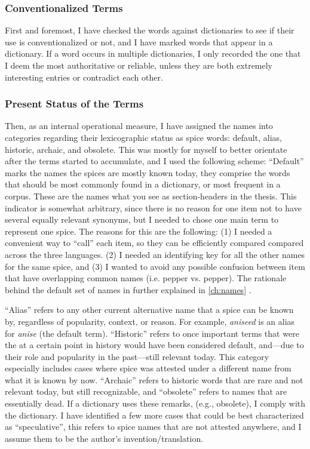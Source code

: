 \subsubsection{Conventionalized Terms}

First and foremost, I have checked the words against dictionaries to see if their use is conventionalized or not, and I have marked words that appear in a dictionary. If a word occurs in multiple dictionaries, I only recorded the one that I deem the most authoritative or reliable, unless they are both extremely interesting entries or contradict each other.

\subsubsection{Present Status of the Terms}

Then, as an internal operational measure, I have assigned the names into categories regarding their lexicographic status as spice words: default, alias, historic, archaic, and obsolete. This was mostly for myself to better orientate after the terms started to accumulate, and I used the following scheme: ``Default'' marks the names the spices are mostly known today, they comprise the words that should be most commonly found in a dictionary, or most frequent in a corpus. These are the names what you see as section-headers in the thesis. This indicator is somewhat arbitrary, since there is no reason for one item not to have several equally relevant synonyms, but I needed to chose one main term to represent one spice. The reasons for this are the following: (1) I needed a convenient way to ``call'' each item, so they can be efficiently compared compared across the three languages. (2) I needed an identifying key for all the other names for the same spice, and (3) I wanted to avoid any possible confusion between item that have overlapping common names (i.e. pepper vs. pepper). The rationale behind the default set of names in further explained in \cref{ch:names} .

``Alias'' refers to any other current alternative name that a spice can be known by, regardless of popularity, context, or reason. For example, \textit{aniseed} is an alias for \textit{anise} (the default term). ``Historic'' refers to once important terms that were the at a certain point in history would have been considered default, and---due to their role and popularity in the past---still relevant today. This category especially includes cases where spice was attested under a different name from what it is known by now. ``Archaic'' refers to historic words that are rare and not relevant today, but still recognizable, and ``obsolete'' refers to names that are essentially dead. If a dictionary uses these remarks, (e.g., obsolete), I comply with the dictionary.
I have identified a few more cases that could be best characterized as ``speculative'', this refers to spice names that are not attested anywhere, and I assume them to be the author's invention/translation. %

